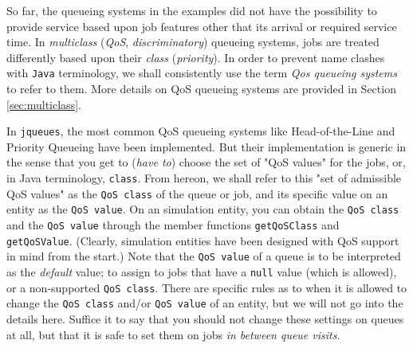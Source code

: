 So far,
the queueing systems in the examples did not
have the possibility to provide service based
upon job features other that its arrival
or required service time.
In {\em multiclass\/} ({\em QoS}, {\em discriminatory\/})
queueing systems,
jobs are treated differently based upon their {\em class\/}
({\em priority\/}).
In order to prevent name clashes with \lstinline|Java|
terminology, we shall consistently use the term
{\em Qos queueing systems\/} to refer to them.
More details on QoS queueing systems are provided
in Section \ref{sec:multiclass}.

In \lstinline-jqueues-, 
the most common QoS queueing systems
like Head-of-the-Line and Priority Queueing
have been implemented.
But their implementation is generic in the sense that
you get to ({\em have to\/})
choose the set of "QoS values" for the jobs,
or, in Java terminology,
\lstinline|class|.
From hereon,
we shall refer to this "set of admissible QoS values"
as the \lstinline|QoS class|
of the queue or job,
and its specific value on an entity
as the \lstinline|QoS value|.
On an simulation entity,
you can obtain the \lstinline|QoS class|
and the \lstinline|QoS value|
through the member functions
\lstinline|getQoSClass| and \lstinline|getQoSValue|.
(Clearly,
simulation entities have been designed
with QoS support in mind
from the start.)
Note that the \lstinline|QoS value| of a queue
is to be interpreted as
the {\em default\/} value;
to assign to jobs that have a \lstinline|null|
value (which is allowed),
or a non-supported \lstinline|QoS class|.
There are specific rules as to when it is allowed
to change the \lstinline|QoS class|
and/or \lstinline|QoS value|
of an entity, but we will not go into the details here.
Suffice it to say that you should not change these
settings on queues at all,
but that it is safe to set them on jobs
{\em in between queue visits}.

